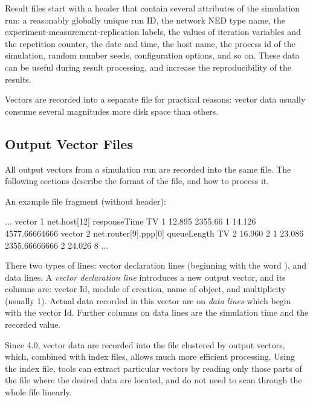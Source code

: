 Result files start with a header that contain several attributes of the
simulation run: a reasonably globally unique run ID, the network NED type
name, the experiment-measurement-replication labels, the values of
iteration variables and the repetition counter, the date and time, the host
name, the process id of the simulation, random number seeds, configuration
options, and so on. These data can be useful during result processing, and
increase the reproducibility of the results.


Vectors are recorded into a separate file for practical reasons: vector
data usually consume several magnitudes more disk space than others.

\subsection{Output Vector Files}

All output vectors from a simulation run are recorded into the same file.
The following sections describe the format of the file, and
how to process it.

An example file fragment (without header):

\begin{filelisting}
...
vector 1   net.host[12]  responseTime  TV
1  12.895  2355.66
1  14.126  4577.66664666
vector 2   net.router[9].ppp[0] queueLength  TV
2  16.960  2
1  23.086  2355.66666666
2  24.026  8
...
\end{filelisting}

There two types of lines: vector declaration lines (beginning with the word
), and data lines. A \textit{vector declaration line}
introduces a new output vector, and its columns are: vector Id, module of
creation, name of  object, and multiplicity (usually 1).
Actual data recorded in this vector are on \textit{data lines} which begin
with the vector Id. Further columns on data lines are the simulation time
and the recorded value.


Since {\opp} 4.0, vector data are recorded into the file clustered by
output vectors, which, combined with index files, allows much more
efficient processing. Using the index file, tools can extract particular
vectors by reading only those parts of the file where the desired data are
located, and do not need to scan through the whole file linearly.



